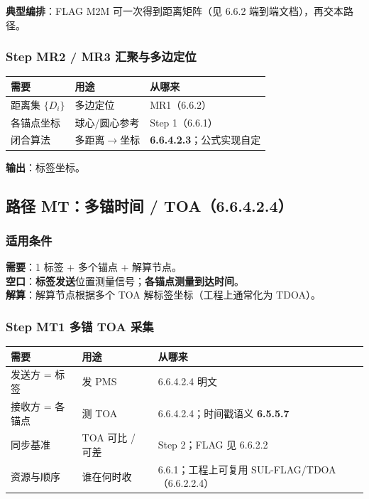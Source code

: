 \documentclass[11pt,a4paper]{ctexart}
\begin{document}
\textbf{典型编排}：FLAG M2M 可一次得到距离矩阵（见 6.6.2 端到端文档），再交本路径。

\subsubsection{Step MR2 / MR3 汇聚与多边定位}

\begin{table}[h]
\centering
\small
\begin{tabular}{L{3.4cm}L{4.8cm}L{4.8cm}}
\toprule
\textbf{需要} & \textbf{用途} & \textbf{从哪来} \\
\midrule
距离集 $\{D_i\}$ & 多边定位 & MR1（6.6.2） \\
各锚点坐标 & 球心/圆心参考 & Step 1（6.6.1） \\
闭合算法 & 多距离$\rightarrow$坐标 & \textbf{6.6.4.2.3}；公式实现自定 \\
\bottomrule
\end{tabular}
\end{table}

\textbf{输出}：标签坐标。

\subsection{路径 MT：多锚时间 / TOA（6.6.4.2.4）}
\label{sec:mt}

\subsubsection{适用条件}

\textbf{需要}：1 标签 + 多个锚点 + 解算节点。\\
\textbf{空口}：\textbf{标签发送}位置测量信号；\textbf{各锚点测量到达时间}。\\
\textbf{解算}：解算节点根据多个 TOA 解标签坐标（工程上通常化为 TDOA）。

\subsubsection{Step MT1 多锚 TOA 采集}

\begin{table}[h]
\centering
\small
\begin{tabular}{L{3.4cm}L{4.8cm}L{4.8cm}}
\toprule
\textbf{需要} & \textbf{用途} & \textbf{从哪来} \\
\midrule
发送方 = 标签 & 发 PMS & 6.6.4.2.4 明文 \\
接收方 = 各锚点 & 测 TOA & 6.6.4.2.4；时间戳语义 \textbf{6.5.5.7} \\
同步基准 & TOA 可比 / 可差 & Step 2；FLAG 见 6.6.2.2 \\
资源与顺序 & 谁在何时收 & 6.6.1；工程上可复用 SUL-FLAG/TDOA（6.6.2.2.4） \\
\bottomrule
\end{tabular}
\end{table}
\end{document}
